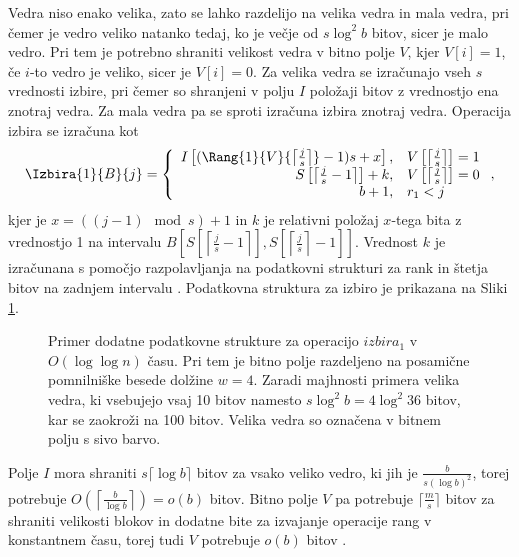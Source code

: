 Vedra niso enako velika, zato se lahko razdelijo na velika vedra in mala vedra, pri čemer je vedro veliko natanko tedaj, ko je večje od $s\log^2 b$ bitov, sicer je malo vedro. Pri tem je potrebno shraniti velikost vedra v bitno polje $V$, kjer $V[i]=1$, če $i$-to vedro je veliko, sicer je $V[i]=0$. Za velika vedra se izračunajo vseh $s$ vrednosti izbire, pri čemer so shranjeni v polju $I$ položaji bitov z vrednostjo ena znotraj vedra. Za mala vedra pa se sproti izračuna izbira znotraj vedra. Operacija izbira se izračuna kot
\begin{equation*}
    \Izbira{1}{B}{j}=\left\{
    \begin{array}{rl}
       I\left[(\Rang{1}{V}{\left\lceil \frac{j}{s} \right\rceil}-1)s+x\right], & V\left[\left\lceil \frac{j}{s} \right\rceil\right] = 1\\ 
       S\left[\left\lceil \frac{j}{s} -1 \right\rceil\right] + k, & V\left[\left\lceil \frac{j}{s} \right\rceil\right] = 0\\
       b+1, & r_1 < j
    \end{array}\right.,
\end{equation*}
kjer je $x = ((j-1) \mod{s})+1$ in $k$ je relativni položaj $x$-tega bita z vrednostjo 1 na intervalu $B\left[ S\left[\left\lceil \frac{j}{s} -1 \right\rceil\right], S\left[\left\lceil \frac{j}{s} \right\rceil-1\right]\right]$. Vrednost $k$ je izračunana s pomočjo razpolavljanja na podatkovni strukturi za rank in štetja bitov na zadnjem intervalu \cite{Navarro2016}. Podatkovna struktura za izbiro je prikazana na Sliki \ref{fig:select}.

\begin{figure}[htb]
    \begin{center}
        
        \caption{Primer dodatne podatkovne strukture za operacijo $izbira_1$ v $O(\log\log{n})$ času. Pri tem je bitno polje razdeljeno na posamične pomnilniške besede dolžine $w=4$. Zaradi majhnosti primera velika vedra, ki vsebujejo vsaj 10 bitov namesto $s\log^2b= 4\log^2{36}$ bitov, kar se zaokroži na 100 bitov. Velika vedra so označena v bitnem polju s sivo barvo.} 
        \label{fig:select}
    \end{center}
\end{figure}

Polje $I$ mora shraniti $s\lceil\log b\rceil$ bitov za vsako veliko vedro, ki jih je $\frac{b}{s(\log b)^2}$, torej potrebuje $O\left(\left\lceil\frac{b}{\log b}\right\rceil\right)=o(b)$ bitov. Bitno polje $V$ pa potrebuje $\lceil \frac{m}{s} \rceil$ bitov za shraniti velikosti blokov in dodatne bite za izvajanje operacije rang v konstantnem času, torej tudi $V$ potrebuje $o(b)$ bitov \cite{Navarro2016}.

